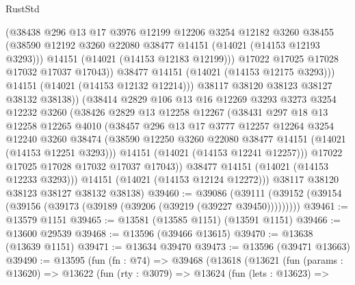 \begin{lexlean}{RustStd}
\begin{coremodule}
                    (@38438
                      @296
                      @13
                      @17
                      @3976
                      @12199
                      @12206
                      @3254
                      @12182
                      @3260
                      @38455
                      (@38590 @12192 @3260 @22080 @38477 @14151 (@14021 (@14153 @12193 @3293)))
                      @14151
                      (@14021 (@14153 @12183 @12199)))
                    @17022
                    @17025
                    @17028
                    @17032
                    @17037
                    @17043))
                @38477
                @14151
                (@14021 (@14153 @12175 @3293)))
              @14151
              (@14021 (@14153 @12132 @12214)))
            @38117
            @38120
            @38123
            @38127
            @38132
            @38138))
        (@38414
          @2829
          @106
          @13
          @16
          @12269
          @3293
          @3273
          @3254
          @12232
          @3260
          (@38426
            @2829
            @13
            @12258
            @12267
            (@38431
              @297
              @18
              @13
              @12258
              @12265
              @4010
              (@38457
                @296
                @13
                @17
                @3777
                @12257
                @12264
                @3254
                @12240
                @3260
                @38474
                (@38590 @12250 @3260 @22080 @38477 @14151 (@14021 (@14153 @12251 @3293)))
                @14151
                (@14021 (@14153 @12241 @12257)))
              @17022
              @17025
              @17028
              @17032
              @17037
              @17043))
          @38477
          @14151
          (@14021 (@14153 @12233 @3293)))
        @14151
        (@14021 (@14153 @12124 @12272)))
      @38117
      @38120
      @38123
      @38127
      @38132
      @38138)
@39460 := @39086
    (@39111 (@39152 (@39154 (@39156 (@39173 (@39189 (@39206 (@39219 (@39227 @39450)))))))))
@39461 := @13579 @1151
@39465 := @13581 (@13585 @1151) (@13591 @1151)
@39466 := @13600 @29539
@39468 := @13596 (@39466 @13615)
@39470 := @13638 (@13639 @1151)
@39471 := @13634 @39470
@39473 := @13596 (@39471 @13663)
@39490 := @13595
    (fun (fn : @74) =>
    @39468
      (@13618
        (@13621
          (fun (params : @13620) =>
          @13622
            (fun (rty : @3079) =>
            @13624
              (fun (lets : @13623) =>

\end{coremodule}
\end{lexlean}
